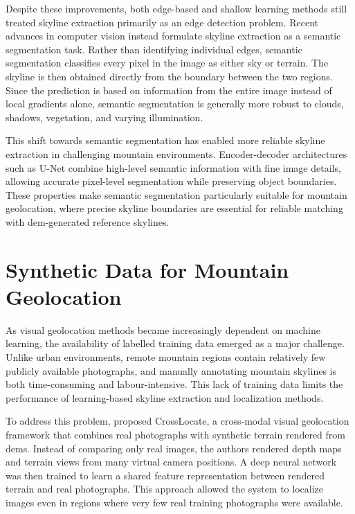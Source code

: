 Despite these improvements, both edge-based and shallow learning methods still treated skyline extraction primarily as an edge detection problem. Recent advances in computer vision instead formulate skyline extraction as a semantic segmentation task. Rather than identifying individual edges, semantic segmentation classifies every pixel in the image as either sky or terrain. The skyline is then obtained directly from the boundary between the two regions. Since the prediction is based on information from the entire image instead of local gradients alone, semantic segmentation is generally more robust to clouds, shadows, vegetation, and varying illumination.

This shift towards semantic segmentation has enabled more reliable skyline extraction in challenging mountain environments. Encoder-decoder architectures such as U-Net combine high-level semantic information with fine image details, allowing accurate pixel-level segmentation while preserving object boundaries. These properties make semantic segmentation particularly suitable for mountain geolocation, where precise skyline boundaries are essential for reliable matching with \Gls{dem}-generated reference skylines.

\section{Synthetic Data for Mountain Geolocation}

As visual geolocation methods became increasingly dependent on machine learning, the availability of labelled training data emerged as a major challenge. Unlike urban environments, remote mountain regions contain relatively few publicly available photographs, and manually annotating mountain skylines is both time-consuming and labour-intensive. This lack of training data limits the performance of learning-based skyline extraction and localization methods.

To address this problem, \cite{tomesek2022crosslocate} proposed CrossLocate, a cross-modal visual geolocation framework that combines real photographs with synthetic terrain rendered from \Glspl{dem}. Instead of comparing only real images, the authors rendered depth maps and terrain views from many virtual camera positions. A deep neural network was then trained to learn a shared feature representation between rendered terrain and real photographs. This approach allowed the system to localize images even in regions where very few real training photographs were available.

